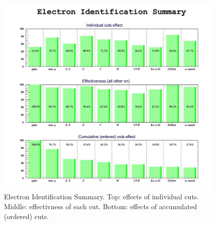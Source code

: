 \vspace{0.6cm}
\begin{figure}[hb]
  \centering
		\includegraphics[width=0.99\textwidth]{img/epidsummary.jpg}
		\caption{Electron Identification Summary. Top: effects of individual cuts.
		         Middle: effectivness of each cut.
               Bottom: effects of accumulated (ordered) cuts.}
 		\label{fig:epidsummary}
\end{figure}















